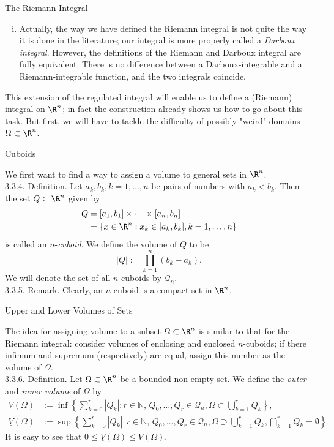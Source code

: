 \documentclass[smaller,hyperref={CJKbookmarks=true}]{beamer}
\newcommand{\N}{\mathbb{N}}
\begin{document}
\begin{frame}{The Riemann Integral}
\begin{spacing}{1.05}
\begin{enumerate}[(i)]
  \item Actually, the way we have defined the Riemann integral is not quite
the way it is done in the literature; our integral is more properly
called a \emph{Darboux integral}. However, the definitions of the Riemann
and Darboux integral are fully equivalent. There is no dif{}ference
between a Darboux-integrable and a Riemann-integrable function,
and the two integrals coincide.
\end{enumerate}
This extension of the regulated integral will enable us to define a
(Riemann) integral on $\R^n$; in fact the construction already shows us how
to go about this task. But first, we will have to tackle the dif{}ficulty of
possibly "weird" domains $\Omega\subset\R^n$.
\end{spacing}
\end{frame}
\begin{frame}[t]{Cuboids}
\begin{spacing}{1.05}
We first want to find a way to assign a volume to general sets in $\R^n$.\\[5pt]
\alert{3.3.4. Definition.} Let $a_k,b_k,k=1,\ldots,n$ be pairs of numbers with $a_k<b_k$. Then the set $Q\subset\R^n$ given by
\begin{equation*}
  \begin{split}
     Q &=[a_1,b_1]\times\cdots\times[a_n,b_n] \\
       &=\{x\in\R^n:x_k\in[a_k,b_k],k=1,\ldots,n\}
  \end{split}
\end{equation*}
is called an $n$-\emph{cuboid}. We define the volume of $Q$ to be
\[|Q|:=\prod_{k=1}^{n}(b_k-a_k).\]
We will denote the set of all $n$-cuboids by $\mathcal{Q}_n$.\\[5pt]
\alert{3.3.5. Remark.} Clearly, an $n$-cuboid is a compact set in $\R^n$.
\end{spacing}
\end{frame}
\begin{frame}[t]{Upper and Lower Volumes of Sets}
\begin{spacing}{1.05}
The idea for assigning volume to a subset $\Omega\subset\R^n$ is similar to that for the
Riemann integral: consider volumes of enclosing and enclosed $n$-cuboids; if
there infimum and supremum (respectively) are equal, assign this number
as the volume of $\Omega$.\\[5pt]
\alert{3.3.6. Definition.} Let $\Omega\subset\R^n$ be a bounded non-empty set. We define the \emph{outer} and \emph{inner volume} of $\Omega$ by
\begin{align*}
  \overline{V}(\Omega) &:=\inf\left\{\sum_{k=0}^{r}|Q_k|:r\in\N,\,
  Q_0,\ldots,Q_r\in\mathcal{Q}_n,\Omega\subset
  \bigcup\limits_{k=1}^rQ_k\right\}, \\
  \underline{V}(\Omega) &:=\sup\left\{\sum_{k=0}^{r}|Q_k|:r\in\N,\,
  Q_0,\ldots,Q_r\in\mathcal{Q}_n,\Omega\supset
  \bigcup\limits_{k=1}^rQ_k,\bigcap\limits_{k=1}^rQ_k
  =\emptyset\right\}.
\end{align*}
It is easy to see that $0\leq\underline{V}(\Omega)\leq\overline{V}(\Omega)$.
\end{spacing}
\end{frame}
\end{document}
